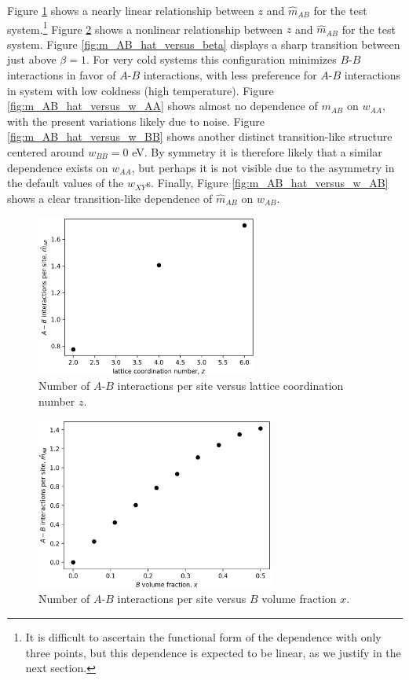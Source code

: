 \documentclass[10pt]{article}
\begin{document}
Figure \ref{fig:m_AB_hat_versus_z} shows a nearly linear relationship between $z$ and $\hat{m}_{AB}$ for the test system.\footnote{It is difficult to ascertain the functional form of the dependence with only three points, but this dependence is expected to be linear, as we justify in the next section.} 
Figure \ref{fig:m_AB_hat_versus_x} shows a nonlinear relationship between $z$ and $\hat{m}_{AB}$ for the test system.
Figure \ref{fig:m_AB_hat_versus_beta} displays a sharp transition between just above $\beta = 1$. For very cold systems this configuration minimizes $B$-$B$ interactions in favor of $A$-$B$ interactions, with less preference for $A$-$B$ interactions in system with low coldness (high temperature).
Figure \ref{fig:m_AB_hat_versus_w_AA} shows almost no dependence of $m_{AB}$ on $w_{AA}$, with the present variations likely due to noise.
Figure \ref{fig:m_AB_hat_versus_w_BB} shows another distinct transition-like structure centered around $w_{BB}=0$ eV.
By symmetry it is therefore likely that a similar dependence exists on $w_{AA}$, but perhaps it is not visible due to the asymmetry in the default values of the $w_{XY}$s.
Finally, Figure \ref{fig:m_AB_hat_versus_w_AB} shows a clear transition-like dependence of $\hat{m}_{AB}$ on $w_{AB}$.

\begin{figure}[h!]
\centering
\includegraphics[width=0.65\textwidth]{Figures/m_AB_hat_versus_z.png}
\caption{Number of $A$-$B$ interactions per site versus lattice coordination number $z$.}
\label{fig:m_AB_hat_versus_z}
\end{figure}

\begin{figure}[h!]
\centering
\includegraphics[width=0.70\textwidth]{Figures/m_AB_hat_versus_x.png}
\caption{Number of $A$-$B$ interactions per site versus $B$ volume fraction $x$.}
\label{fig:m_AB_hat_versus_x}
\end{figure}
\end{document}
